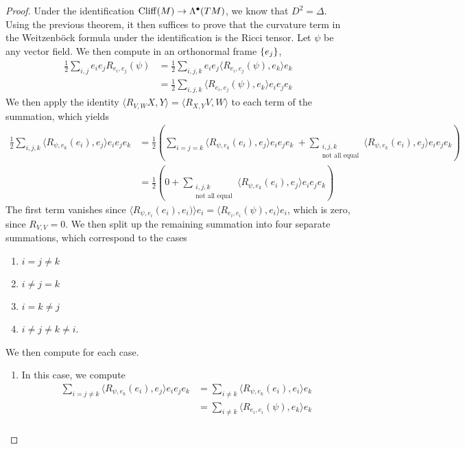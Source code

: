 \begin{proof}
Under the identification $\operatorname{Cliff}(M) \to \Lambda^\bullet(TM)$, we know that
$D^2 = \Delta$. Using the previous theorem, it then suffices to prove that the curvature
term in the Weitzenb\"ock formula under the identification is the Ricci tensor.
Let $\psi$ be any vector field. We then compute in an orthonormal frame $\left\lbrace e_j \right\rbrace$,
\begin{align*}
\frac{1}{2}\sum_{i,j}e_ie_jR_{e_i,e_j}(\psi)
&= \frac{1}{2}\sum_{i,j,k}e_ie_j\langle R_{e_i,e_j}(\psi), e_k\rangle e_k \\
&= \frac{1}{2}\sum_{i,j,k}\langle R_{e_i,e_j}(\psi), e_k\rangle e_ie_je_k
\end{align*}
We then apply the identity $\langle R_{V,W}X,Y\rangle = \langle R_{X,Y}V, W \rangle$
to each term of the summation, which yields
\begin{align*}
\frac{1}{2}\sum_{i,j,k} \langle R_{\psi,e_k}(e_i), e_j\rangle e_ie_je_k
&= \frac{1}{2}\left( \sum_{i = j = k} \langle R_{\psi,e_k}(e_i), e_j\rangle e_ie_je_k
~+ \sum_{\substack{i,j,k \\ \text{not all equal}}}
\langle R_{\psi,e_k}(e_i), e_j\rangle e_ie_je_k \right) \\[5pt]
&= \frac{1}{2}\left( 0 + \sum_{\substack{i,j,k \\ \text{not all equal}}}
\langle R_{\psi,e_k}(e_i), e_j\rangle e_ie_je_k \right)
\end{align*}
The first term vanishes since
$\langle R_{\psi,e_i}(e_i), e_i) \rangle e_i =\langle R_{e_i,e_i}(\psi),e_i\rangle e_i$,
which is zero, since $R_{V,V} = 0$. We then split up the remaining summation into four
separate summations, which correspond to the cases
\begin{enumerate}
  \item $i = j \neq k$
  \item $i \neq j = k$
  \item $i = k \neq j$
  \item $i \neq j \neq k \neq i$.
\end{enumerate}
We then compute for each case.
\begin{enumerate}
  \item In this case, we compute
  \begin{align*}
  \sum_{i =j \neq k}\langle R_{\psi,e_k}(e_i), e_j\rangle e_ie_je_k
  &= \sum_{i \neq k} \langle R_{\psi,e_k}(e_i), e_i\rangle e_k \\
  &= \sum_{i \neq k} \langle R_{e_i,e_i}(\psi), e_k\rangle e_k \\

\end{align*}
\end{enumerate}
\end{proof}
